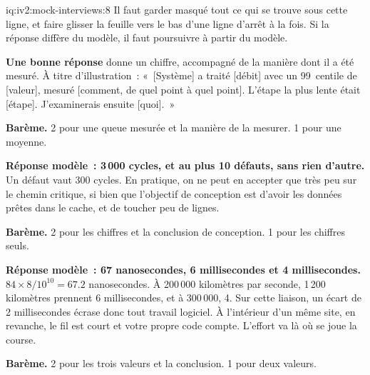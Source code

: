 \begin{solution}{iq:iv2:mock-interviews:8}
Il faut garder masqué tout ce qui se trouve sous cette ligne, et faire glisser la feuille vers le bas d'une ligne d'arrêt à la fois. Si la réponse diffère du modèle, il faut poursuivre à partir du modèle.

\ivstop
\textbf{Une bonne réponse} donne un chiffre, accompagné de la manière dont il a été mesuré. À titre d'illustration~: «~[Système] a traité [débit] avec un 99~centile de [valeur], mesuré [comment, de quel point à quel point]. L'étape la plus lente était [étape]. J'examinerais ensuite [quoi].~»

\textbf{Barème.} 2 pour une queue mesurée et la manière de la mesurer. 1 pour une moyenne.

\ivstop
\textbf{Réponse modèle~: 3\,000 cycles, et au plus 10 défauts, sans rien d'autre.} Un défaut vaut 300 cycles. En pratique, on ne peut en accepter que très peu sur le chemin critique, si bien que l'objectif de conception est d'avoir les données prêtes dans le cache, et de toucher peu de lignes.

\textbf{Barème.} 2 pour les chiffres et la conclusion de conception. 1 pour les chiffres seuls.

\ivstop
\textbf{Réponse modèle~: 67 nanosecondes, 6 millisecondes et 4 millisecondes.} $84 \times 8/10^{10} = 67.2$ nanosecondes. À 200\,000 kilomètres par seconde, 1\,200 kilomètres prennent 6 millisecondes, et à 300\,000, 4. Sur cette liaison, un écart de 2 millisecondes écrase donc tout travail logiciel. À l'intérieur d'un même site, en revanche, le fil est court et votre propre code compte. L'effort va là où se joue la course.

\textbf{Barème.} 2 pour les trois valeurs et la conclusion. 1 pour deux valeurs.


\end{solution}
